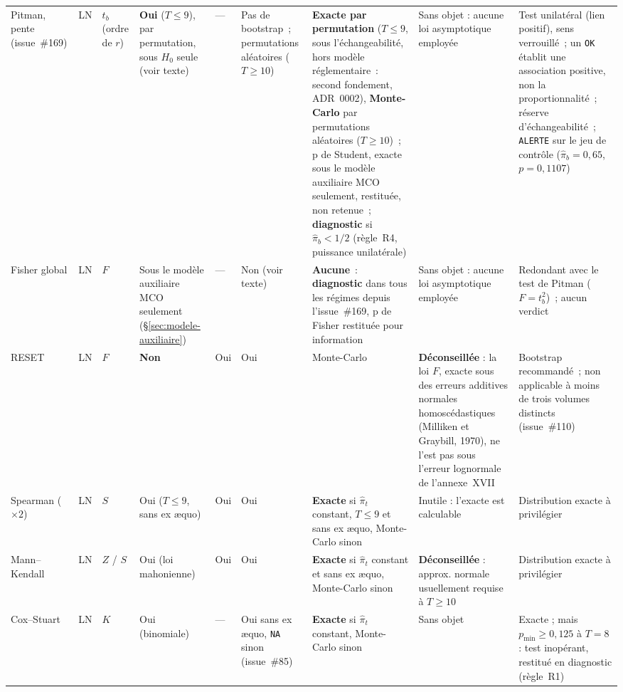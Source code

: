 \documentclass[a4paper,11pt]{article}
\newcommand{\code}[1]{\texttt{\small #1}}
\begin{document}
\begin{landscape}
\begin{center}
\begin{longtable}{@{}p{2.9cm}p{1.5cm}p{1.1cm}p{1.3cm}p{1.3cm}p{1.3cm}p{2.7cm}p{4.7cm}p{4.1cm}@{}}
Pitman, pente (issue~\#169) & LN & $t_b$ (ordre de $r$) & \textbf{Oui} ($T \le 9$), par
permutation, sous $H_0$ seule (voir texte) & --- & Pas de bootstrap~; permutations aléatoires
($T \ge 10$) &
\textbf{Exacte par permutation} ($T \le 9$, sous l'échangeabilité, hors modèle réglementaire~:
second fondement, ADR~0002), \textbf{Monte-Carlo} par permutations aléatoires ($T \ge 10$)~; p de
Student, exacte sous le modèle auxiliaire MCO seulement, restituée, non retenue~;
\textbf{diagnostic} si $\hat\pi_b < 1/2$ (règle~R4, puissance unilatérale) &
Sans objet : aucune loi asymptotique employée & Test unilatéral (lien positif), sens verrouillé~;
un \code{OK} établit une association positive, non la proportionnalité~; réserve
d'échangeabilité~; \code{ALERTE} sur le jeu de contrôle ($\hat\pi_b = 0{,}65$, $p = 0{,}1107$) \\

Fisher global & LN & $F$ & Sous le modèle auxiliaire MCO seulement (§\ref{sec:modele-auxiliaire}) & --- & Non (voir texte) &
\textbf{Aucune}~: \textbf{diagnostic} dans tous les régimes depuis l'issue~\#169, p de Fisher
restituée pour information &
Sans objet : aucune loi asymptotique employée & Redondant avec le test de Pitman ($F = t_b^2$)~;
aucun verdict \\

RESET & LN & $F$ & \textbf{Non} & Oui & Oui & Monte-Carlo &
\textbf{Déconseillée} : la loi $F$, exacte sous des erreurs additives normales homoscédastiques
(Milliken et Graybill, 1970), ne l'est pas sous l'erreur lognormale de l'annexe~XVII & Bootstrap
recommandé~; non applicable à moins de trois volumes distincts (issue~\#110) \\

Spearman ($\times 2$) & LN & $S$ & Oui ($T\le 9$, sans ex \ae quo) & Oui & Oui & \textbf{Exacte} si
$\hat\pi_t$ constant, $T \le 9$ et sans ex \ae quo, Monte-Carlo sinon &
Inutile : l'exacte est calculable & Distribution exacte à privilégier \\

Mann--Kendall & LN & $Z$ / $S$ & Oui (loi mahonienne) & Oui & Oui & \textbf{Exacte} si
$\hat\pi_t$ constant et sans ex \ae quo, Monte-Carlo sinon &
\textbf{Déconseillée} : approx. normale usuellement requise à $T\ge 10$ &
Distribution exacte à privilégier \\

Cox--Stuart & LN & $K$ & Oui (binomiale) & --- & Oui sans ex \ae quo, \code{NA} sinon
(issue~\#85) & \textbf{Exacte} si
$\hat\pi_t$ constant, Monte-Carlo sinon &
Sans objet & Exacte ; mais $p_{\min} \ge 0{,}125$ à $T=8$ : test inopérant, restitué en
diagnostic (règle~R1) \\


\end{longtable}
\end{center}
\end{landscape}
\end{document}
